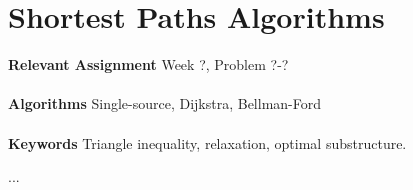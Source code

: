 
\chapter{Shortest Paths Algorithms}
\label{ch:shortestpathsalgorithms}

\textbf{Relevant Assignment} Week ?, Problem ?-?\\\\
\textbf{Algorithms} Single-source, Dijkstra, Bellman-Ford\\\\
\textbf{Keywords} Triangle inequality, relaxation, optimal substructure.
\vspace{1in}

\noindent ...

